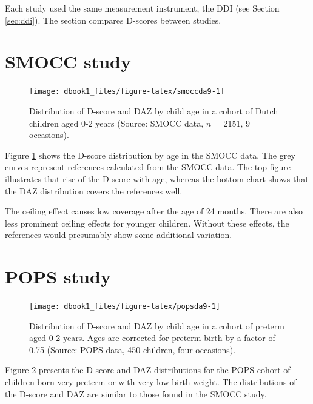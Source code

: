 \documentclass[
]{book}
\begin{document}
Each study used the same measurement instrument, the DDI (see Section \ref{sec:ddi}). The section compares D-scores between studies.

\hypertarget{sec:smoccstudy}{%
\section{SMOCC study}\label{sec:smoccstudy}}

\begin{figure}

{\centering \texttt{[image: dbook1\_files/figure-latex/smoccda9-1]} 

}

\caption{Distribution of D-score and DAZ by child age in a cohort of Dutch children aged 0-2 years (Source: SMOCC data, \(n\) = 2151, 9 occasions).}\label{fig:smoccda9}
\end{figure}



Figure \ref{fig:smoccda9} shows the D-score distribution by age in the SMOCC data. The grey curves represent references calculated from the SMOCC data. The top figure illustrates that rise of the D-score with age, whereas the bottom chart shows that the DAZ distribution covers the references well.

The ceiling effect causes low coverage after the age of 24 months. There are also less prominent ceiling effects for younger children. Without these effects, the references would presumably show some additional variation.

\hypertarget{sec:pops}{%
\section{POPS study}\label{sec:pops}}

\begin{figure}

{\centering \texttt{[image: dbook1\_files/figure-latex/popsda9-1]} 

}

\caption{Distribution of D-score and DAZ by child age in a cohort of preterm aged 0-2 years. Ages are corrected for preterm birth by a factor of 0.75 (Source: POPS data, 450 children, four occasions).}\label{fig:popsda9}
\end{figure}



Figure \ref{fig:popsda9} presents the D-score and DAZ distributions for the POPS cohort of children born very preterm or with very low birth weight. The distributions of the D-score and DAZ are similar to those found in the SMOCC study.
\end{document}
